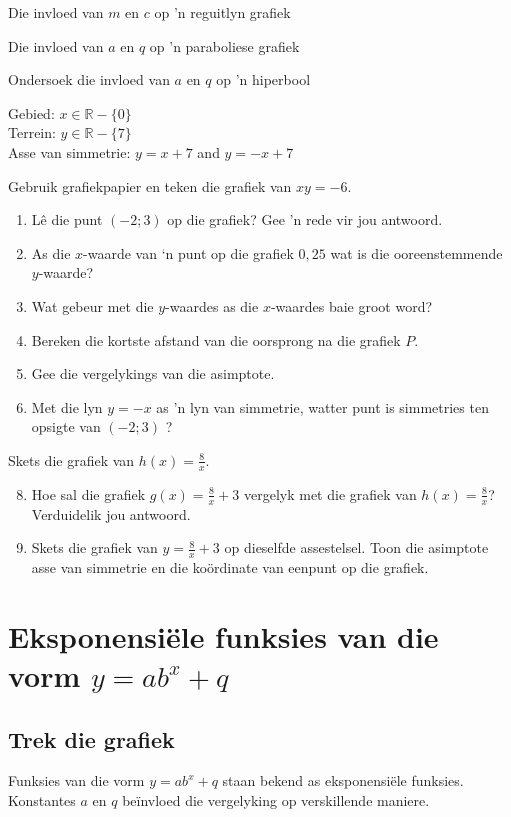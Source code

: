 \begin{Ondersoek}{Die invloed van $m$ en $c$ op 'n reguitlyn grafiek}
\begin{Ondersoek}{Die invloed van $a$ en $q$ op 'n paraboliese grafiek}
\begin{Ondersoek}{Ondersoek die invloed van $a$ en $q$ op 'n hiperbool}
\begin{wex}
{Gebied: $x \in \mathbb{R} - \{0\}$\\
Terrein: $y \in \mathbb{R} - \{7\}$\\
Asse van simmetrie: $y=x+7$ and $y=-x+7$


}
\end{wex}

\begin{exercises}{}
{
Gebruik grafiekpapier en teken die grafiek van  $xy=-6$.
    \begin{enumerate}[noitemsep, label=\textbf{\arabic*}. ] 
    \item Lê die punt $(-2; 3)$  op die grafiek? Gee ’n rede vir jou antwoord.

    \item As die $x$-waarde van ‘n punt op die grafiek $0,25$ wat is die ooreenstemmende $y$-waarde?
    \item Wat gebeur met die $y$-waardes as die $x$-waardes baie groot word?
\item Bereken die kortste afstand van die oorsprong na die grafiek $P$.
\item Gee die vergelykings van die asimptote.
    \item Met die lyn $y=-x$ as ’n lyn van simmetrie, watter punt is simmetries ten opsigte van $(-2; 3)$ ?
    \end{enumerate}
Skets die grafiek van  $h(x)=\frac{8}{x}$.
    \begin{enumerate}[noitemsep, label=\textbf{\arabic*}. ] 
\setcounter{enumi}{7}
    \item Hoe sal die grafiek $g(x)=\frac{8}{x}+3$ vergelyk met die grafiek van $h(x)=\frac{8}{x}$? Verduidelik jou antwoord.
    \item Skets die grafiek van $y=\frac{8}{x}+3$ op dieselfde assestelsel. Toon die asimptote asse van simmetrie en die ko\"ordinate van eenpunt op die grafiek.
    \end{enumerate}


}
\end{exercises}

\section{Eksponensiële funksies van die vorm $y=ab^{x}+q$}

\subsection*{Trek die grafiek}         
Funksies van die vorm $y=ab^{x}+q$ staan bekend as eksponensiële funksies. Konstantes $a$ en $q$ be\"invloed die vergelyking op verskillende maniere.


\end{Ondersoek}
\end{Ondersoek}
\end{Ondersoek}

